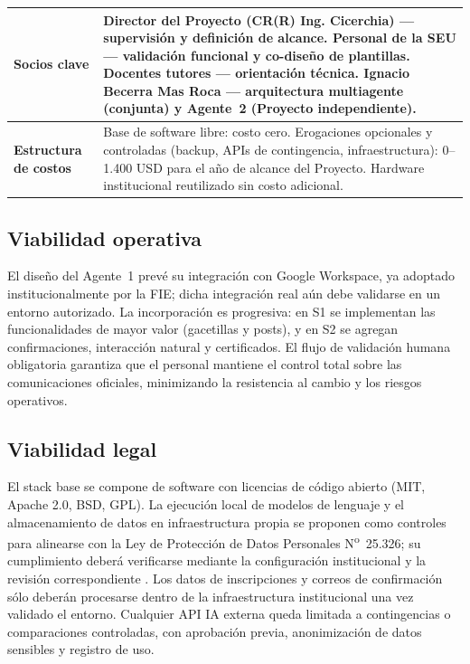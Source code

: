 \documentclass[a4paper, 12pt]{article}
\begin{document}
\begin{table}[H]
\begin{tabularx}{\textwidth}{|l|X|}
    \hline
    \textbf{Socios clave} &
    Director del Proyecto (CR(R) Ing. Cicerchia) --- supervisi\'on y definici\'on de alcance. Personal de la SEU --- validaci\'on funcional y co-dise\~no de plantillas. Docentes tutores --- orientaci\'on t\'ecnica. Ignacio Becerra Mas Roca --- arquitectura multiagente (conjunta) y Agente~2 (Proyecto independiente). \\
    \hline
    \textbf{Estructura de costos} &
    Base de software libre: costo cero. Erogaciones opcionales y controladas (backup, APIs de contingencia, infraestructura): 0--1.400 USD para el a\~no de alcance del Proyecto. Hardware institucional reutilizado sin costo adicional. \\
    \hline
  \end{tabularx}
\end{table}

\subsection{Viabilidad operativa}

El dise\~no del Agente~1 prev\'e su integraci\'on con Google Workspace, ya adoptado institucionalmente por la \ac{FIE}; dicha integraci\'on real a\'un debe validarse en un entorno autorizado. La incorporaci\'on es progresiva: en S1 se implementan las funcionalidades de mayor valor (gacetillas y posts), y en S2 se agregan confirmaciones, interacci\'on natural y certificados. El flujo de validaci\'on humana obligatoria garantiza que el personal mantiene el control total sobre las comunicaciones oficiales, minimizando la resistencia al cambio y los riesgos operativos.

\subsection{Viabilidad legal}

El stack base se compone de software con licencias de c\'odigo abierto (MIT, Apache 2.0, BSD, GPL). La ejecuci\'on local de modelos de lenguaje y el almacenamiento de datos en infraestructura propia se proponen como controles para alinearse con la Ley de Protecci\'on de Datos Personales N\textsuperscript{o}~25.326; su cumplimiento deber\'a verificarse mediante la configuraci\'on institucional y la revisi\'on correspondiente \parencite{ley25326}. Los datos de inscripciones y correos de confirmaci\'on s\'olo deber\'an procesarse dentro de la infraestructura institucional una vez validado el entorno. Cualquier API IA externa queda limitada a contingencias o comparaciones controladas, con aprobaci\'on previa, anonimizaci\'on de datos sensibles y registro de uso.
\end{document}
